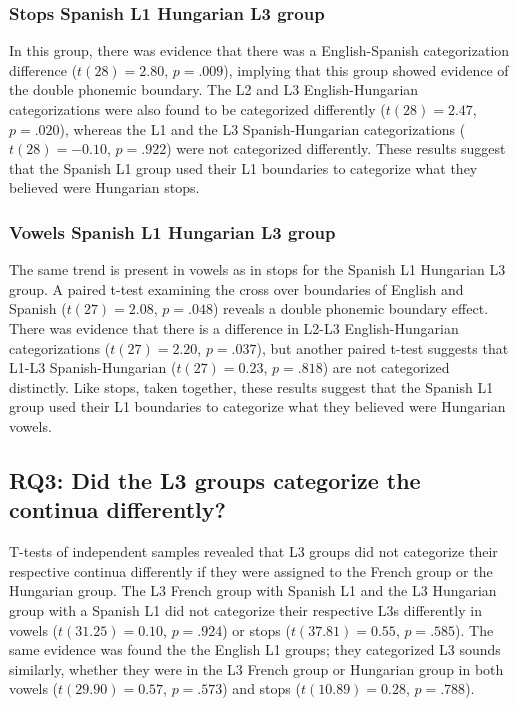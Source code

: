 \documentclass[
  man]{apa6}
\begin{document}
\hypertarget{stops-spanish-l1-hungarian-l3-group}{%
\subsubsection{Stops Spanish L1 Hungarian L3 group}\label{stops-spanish-l1-hungarian-l3-group}}

In this group, there was evidence that there was a English-Spanish categorization difference (\(t(28) = 2.80\), \(p = .009\)), implying that this group showed evidence of the double phonemic boundary. The L2 and L3 English-Hungarian categorizations were also found to be categorized differently (\(t(28) = 2.47\), \(p = .020\)), whereas the L1 and the L3 Spanish-Hungarian categorizations (\(t(28) = -0.10\), \(p = .922\)) were not categorized differently.
These results suggest that the Spanish L1 group used their L1 boundaries to categorize what they believed were Hungarian stops.

\hypertarget{vowels-spanish-l1-hungarian-l3-group}{%
\subsubsection{Vowels Spanish L1 Hungarian L3 group}\label{vowels-spanish-l1-hungarian-l3-group}}

The same trend is present in vowels as in stops for the Spanish L1 Hungarian L3 group. A paired t-test examining the cross over boundaries of English and Spanish (\(t(27) = 2.08\), \(p = .048\)) reveals a double phonemic boundary effect. There was evidence that there is a difference in L2-L3 English-Hungarian categorizations (\(t(27) = 2.20\), \(p = .037\)), but another paired t-test suggests that L1-L3 Spanish-Hungarian (\(t(27) = 0.23\), \(p = .818\)) are not categorized distinctly. Like stops, taken together, these results suggest that the Spanish L1 group used their L1 boundaries to categorize what they believed were Hungarian vowels.

\hypertarget{rq3-did-the-l3-groups-categorize-the-continua-differently}{%
\subsection{RQ3: Did the L3 groups categorize the continua differently?}\label{rq3-did-the-l3-groups-categorize-the-continua-differently}}

T-tests of independent samples revealed that L3 groups did not categorize their respective continua differently if they were assigned to the French group or the Hungarian group. The L3 French group with Spanish L1 and the L3 Hungarian group with a Spanish L1 did not categorize their respective L3s differently in vowels (\(t(31.25) = 0.10\), \(p = .924\)) or stops (\(t(37.81) = 0.55\), \(p = .585\)). The same evidence was found the the English L1 groups; they categorized L3 sounds similarly, whether they were in the L3 French group or Hungarian group in both vowels (\(t(29.90) = 0.57\), \(p = .573\)) and stops (\(t(10.89) = 0.28\), \(p = .788\)).
\end{document}

